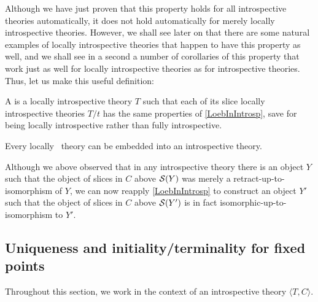Although we have just proven that this property holds for all introspective theories automatically, it does not hold automatically for merely locally introspective theories. However, we shall see later on that there are some natural examples of locally introspective theories that happen to have this property as well, and we shall see in a second a number of corollaries of this property that work just as well for locally introspective theories as for introspective theories. Thus, let us make this useful definition:

\begin{definition}
A  is a locally introspective theory $T$ such that each of its slice locally introspective theories $T/t$ has the same properties of \cref{LoebInIntrosp}, save for being locally introspective rather than fully introspective.
\end{definition}

\begin{conjecture}
Every locally \Loeb\ theory can be embedded into an introspective theory.
\end{conjecture}

\begin{observation}
Although we above observed that in any introspective theory there is an object $Y$ such that the object of slices in $C$ above $\mathcal{S}(Y)$ was merely a retract-up-to-isomorphism of $Y$, we can now reapply \cref{LoebInIntrosp} to construct an object $Y'$ such that the object of slices in $C$ above $\mathcal{S}(Y')$ is in fact isomorphic-up-to-isomorphism to $Y'$. 
\end{observation}

\subsection{Uniqueness and initiality/terminality for fixed points}
Throughout this section, we work in the context of an introspective theory $\langle T, C \rangle$. 

